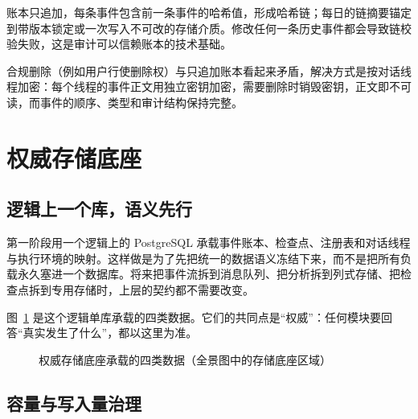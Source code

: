 账本只追加，每条事件包含前一条事件的哈希值，形成哈希链；每日的链摘要锚定到带版本锁定或一次写入不可改的存储介质。修改任何一条历史事件都会导致链校验失败，这是审计可以信赖账本的技术基础。

合规删除（例如用户行使删除权）与只追加账本看起来矛盾，解决方式是按对话线程加密：每个线程的事件正文用独立密钥加密，需要删除时销毁密钥，正文即不可读，而事件的顺序、类型和审计结构保持完整。

\section{权威存储底座}
\label{sec:storage}

\subsection{逻辑上一个库，语义先行}

第一阶段用一个逻辑上的 PostgreSQL 承载事件账本、检查点、注册表和对话线程与执行环境的映射。这样做是为了先把统一的数据语义冻结下来，而不是把所有负载永久塞进一个数据库。将来把事件流拆到消息队列、把分析拆到列式存储、把检查点拆到专用存储时，上层的契约都不需要改变。

图~\ref{fig:zoom-storage} 是这个逻辑单库承载的四类数据。它们的共同点是“权威”：任何模块要回答“真实发生了什么”，都以这里为准。

\begin{figure}[htbp]
\centering
{}
\caption[权威存储底座的四类数据]{权威存储底座承载的四类数据（全景图中的存储底座区域）}
\label{fig:zoom-storage}
\end{figure}

\subsection{容量与写入量治理}

